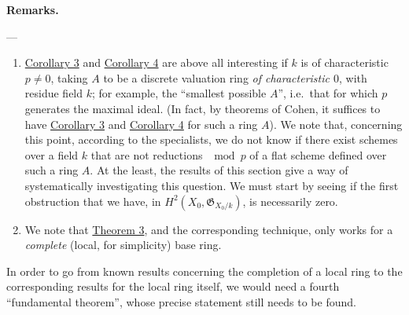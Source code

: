 \documentclass{article}
\newenvironment{rmenv}[1]
  {\phantomsection\par\smallskip\noindent\textbf{#1.}\rmfamily}
  {\par\smallskip}
\newcommand{\oldpage}[1]{\marginpar{\footnotesize$\Big\vert$ \textit{p.~#1}}}
\theoremstyle{definition}
\theoremstyle{definition}
\theoremstyle{definition}
\theoremstyle{definition}
\theoremstyle{remark}
\begin{document}
\begin{rmenv}{Remarks}

---

\begin{enumerate}
\def\labelenumi{\arabic{enumi}.}
\item
  \protect\hyperlink{fga-2-theorem-9-corollary-3}{Corollary 3} and \protect\hyperlink{fga-2-theorem-9-corollary-4}{Corollary 4} are above all interesting if \(k\) is of characteristic \(p\neq0\), taking \(A\) to be a discrete valuation ring \emph{of characteristic \(0\)}, with residue field \(k\);
  for example, the ``smallest possible \(A\)'', i.e.~that for which \(p\) generates the maximal ideal.
  (In fact, by theorems of Cohen, it suffices to have \protect\hyperlink{fga-2-theorem-9-corollary-3}{Corollary 3} and \protect\hyperlink{fga-2-theorem-9-corollary-4}{Corollary 4} for such a ring \(A\)).
  We note that, concerning this point, according to the specialists, we do not know if there exist schemes over a field \(k\) that are not reductions \(\mod p\) of a flat scheme defined over such a ring \(A\).
  At the least, the results of this section give a way of systematically investigating this question.
  We must start by seeing if the first obstruction that we have, in \(H^2(X_0,{\mathfrak{G}}_{X_0/k})\), is necessarily zero.
\item
  \oldpage{182-15}We note that \protect\hyperlink{fga-2-theorem-3}{Theorem 3}, and the corresponding technique, only works for a \emph{complete} (local, for simplicity) base ring.
\end{enumerate}

In order to go from known results concerning the completion of a local ring to the corresponding results for the local ring itself, we would need a fourth ``fundamental theorem'', whose precise statement still needs to be found.


\end{rmenv}
\end{document}
